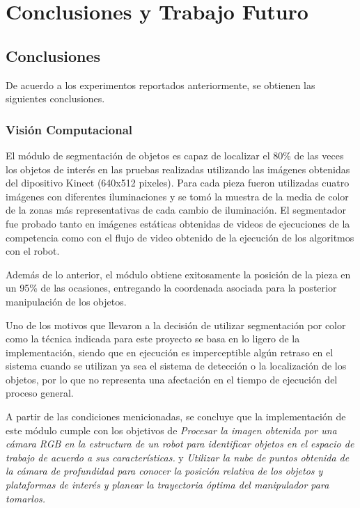 \chapter{Conclusiones y Trabajo Futuro}
\section{Conclusiones}
De acuerdo a los experimentos reportados anteriormente, se obtienen las siguientes conclusiones.
\subsection{Visión Computacional}
El módulo de segmentación de objetos es capaz de localizar el 80\% de las veces los objetos de interés en las pruebas realizadas utilizando las imágenes obtenidas del dipositivo Kinect (640x512 pixeles). Para cada pieza fueron utilizadas cuatro imágenes con diferentes iluminaciones y se tomó la muestra de la media de color de la zonas más representativas de cada cambio de iluminación.
El segmentador fue probado tanto en imágenes estáticas obtenidas de videos de ejecuciones de la competencia como con el flujo de video obtenido de la ejecución de los algoritmos con el robot.

Además de lo anterior, el módulo obtiene exitosamente la posición de la pieza en un 95\% de las ocasiones, entregando la coordenada asociada para la posterior manipulación de los objetos.

Uno de los motivos que llevaron a la decisión de utilizar segmentación por color como la técnica indicada para este proyecto se basa en lo ligero de la implementación, siendo que en ejecución es imperceptible algún retraso en el sistema cuando se utilizan ya sea el sistema de detección o la localización de los objetos, por lo que no representa una afectación en el tiempo de ejecución del proceso general.

A partir de las condiciones menicionadas, se concluye que la implementación de este módulo cumple con los objetivos de \textit{Procesar la imagen obtenida por una cámara RGB en la estructura de un robot para identificar objetos en el espacio de trabajo de acuerdo a sus características.} y \textit{Utilizar la nube de puntos  obtenida de la cámara de profundidad para conocer la posición relativa de los objetos y plataformas de interés y planear la trayectoria óptima del manipulador para tomarlos.}

